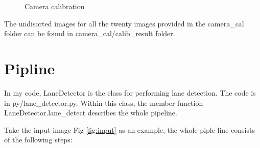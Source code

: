 \documentclass[12pt]{article}
\begin{document}
\begin{figure}[h]
\centering
{}
\qquad
{}
\qquad
{}
\qquad
{}
\caption{Camera calibration}
\label{fig:camera_calib}
\end{figure}

The undisorted images for all the twenty images provided in the  camera\_cal folder can be found in  camera\_cal/calib\_result folder.
  
    
\section{Pipline}
In my code, LaneDetector is the class for performing lane detection. The code is in py/lane\_detector.py. Within this class, the member function LaneDetector.lane\_detect describes the whole pipeline.

Take the input image Fig \ref{fig:input} as an example, the whole piple line consists of the following steps:
\end{document}
